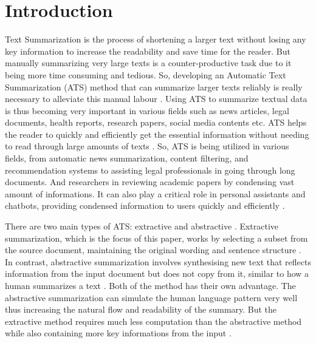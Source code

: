\documentclass[acmlarge]{acmart}
\begin{document}
\section{Introduction}\label{sec:introduction}
Text Summarization is the process of shortening a larger text without losing any key information to increase the readability and save time for the reader. But manually summarizing very large texts is a counter-productive task due to it being more time consuming and tedious. So, developing an Automatic Text Summarization (ATS) method that can summarize larger texts reliably is really necessary to alleviate this manual labour \cite{Widyassari-2022-rev-ats-tech-met}. 
Using ATS to summarize textual data is thus becoming very important in various fields such as news articles, legal documents, health reports, research papers, social media contents etc. ATS helps the reader to quickly and efficiently get the essential information without needing to read through large amounts of texts \cite{wafaa-2021-summary-comprehensive-review}. So, ATS is being utilized in various fields, from automatic news summarization, content filtering, and recommendation systems to assisting legal professionals in going through long documents. And researchers in reviewing academic papers by condensing vast amount of informations. It can also play a critical role in personal assistants and chatbots, providing condensed information to users quickly and efficiently \cite{tas-2017-rev-text-sum-2}.

There are two main types of ATS: extractive and abstractive \cite{tas-2017-rev-text-sum-2}. Extractive summarization, which is the focus of this paper, works by selecting a subset from the source document, maintaining the original wording and sentence structure \cite{moratanch-2017-extractive-review}. In contrast, abstractive summarization involves synthesising new text that reflects information from the input document but does not copy from it, similar to how a human summarizes a text \cite{Moratanch-2016-abstractive-rev}. Both of the method has their own advantage. The abstractive summarization can simulate the human language pattern very well thus increasing the natural flow and readability of the summary. But the extractive method requires much less computation than the abstractive method while also containing more key informations from the input \cite{gupta-2010-extractive-rev}.
\end{document}

